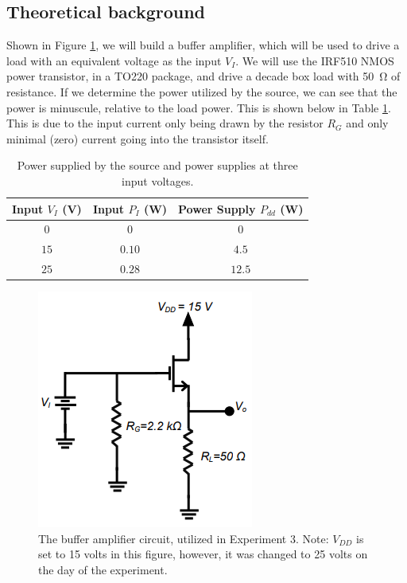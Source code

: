 \documentclass{report}
\begin{document}
\subsection{Theoretical background}
Shown in Figure \ref{fig:exp3ckt}, we will build a buffer amplifier, which will be used to drive a load with an equivalent voltage as the input $V_I$. We will use the IRF510 NMOS power transistor, in a TO220 package, and drive a decade box load with \SI{50}{\ohm} of resistance. If we determine the power utilized by the source, we can see that the power is minuscule, relative to the load power. This is shown below in Table \ref{table:exp3power}. This is due to the input current only being drawn by the resistor $R_G$ and only minimal (zero) current going into the transistor itself.
\begin{table}[H]
	\centering
	\caption{Power supplied by the source and power supplies at three input voltages.}
	\label{table:exp3power}
	\begin{threeparttable}
		\begin{tabular}{ccc}
			\toprule
			Input $V_{I}$ (V) & Input $P_{I}$ (W) & Power Supply $P_{dd}$ (W) \\
			\midrule
			$0$ & $0$ & $0$ \\
			$15$ & $0.10$ & $4.5$ \\
			$25$ & $0.28$ & $12.5$ \\
			\bottomrule
		\end{tabular}
	\end{threeparttable}
\end{table}
\begin{figure}[h]
	\centering
	\includegraphics[width=0.3\linewidth]{exp3ckt}
	\caption{The buffer amplifier circuit, utilized in Experiment 3. Note: $V_{DD}$ is set to 15 volts in this figure, however, it was changed to 25 volts on the day of the experiment.}
	\label{fig:exp3ckt}
\end{figure}
\end{document}
